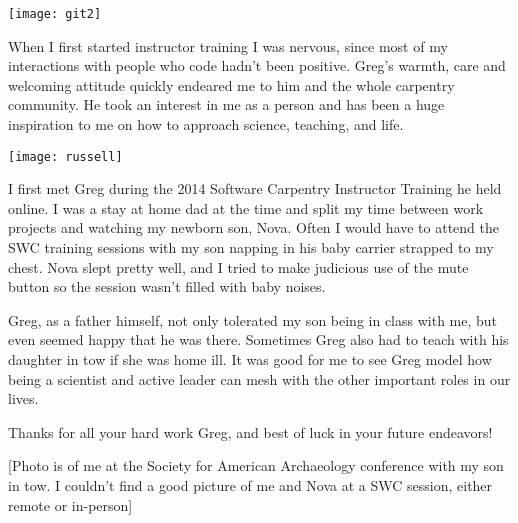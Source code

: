 \newpage
\vspace*{\fill}

\texttt{[image: git2]}

When I first started instructor training I was nervous, since most of my
interactions with people who code hadn't been positive. Greg's warmth, care and
welcoming attitude quickly endeared me to him and the whole carpentry
community. He took an interest in me as a person and has been a huge
inspiration to me on how to approach science, teaching, and life. 

\vspace*{\fill}

\newpage
\vspace*{\fill}
\begin{minipage}{0.45\textwidth}
    \texttt{[image: russell]}
\end{minipage}
\hfill
\begin{minipage}{0.45\textwidth}
\setlength{\parindent}{0in}
\setlength{\parskip}{1em}
I first met Greg during the 2014 Software Carpentry Instructor Training he held
online. I was a stay at home dad at the time and split my time between work
projects and watching my newborn son, Nova. Often I would have to attend
the SWC training sessions with my son napping in his baby carrier strapped
to my chest. Nova slept pretty well, and I tried to make judicious use of
the mute button so the session wasn't filled with baby noises. 

Greg, as a father himself, not only tolerated my son being in class with
me, but even seemed happy that he was there. Sometimes Greg also had to
teach with his daughter in tow if she was home ill. It was good for me to
see Greg model how being a scientist and active leader can mesh with the
other important roles in our lives. 

Thanks for all your hard work Greg, and best of luck in your future endeavors! 

[Photo is of me at the Society for American Archaeology conference with my son
in tow. I couldn't find a good picture of me and Nova at a SWC session, either
remote or in-person]

\end{minipage}
\vspace*{\fill}

\newpage
\vspace*{\fill}

